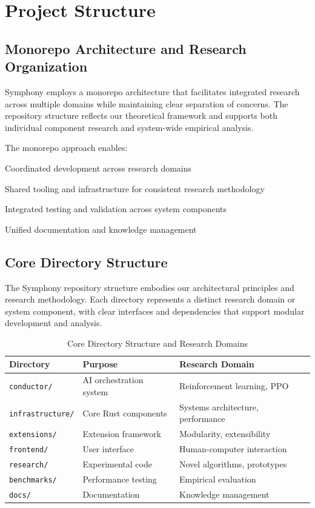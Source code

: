 \section*{Project Structure}

\subsection*{Monorepo Architecture and Research Organization}

Symphony employs a monorepo architecture that facilitates integrated research across multiple domains while maintaining clear separation of concerns. The repository structure reflects our theoretical framework and supports both individual component research and system-wide empirical analysis.

The monorepo approach enables:
\begin{compactlist}
    \item Coordinated development across research domains
    \item Shared tooling and infrastructure for consistent research methodology
    \item Integrated testing and validation across system components
    \item Unified documentation and knowledge management
\end{compactlist}

\subsection*{Core Directory Structure}

The Symphony repository structure embodies our architectural principles and research methodology. Each directory represents a distinct research domain or system component, with clear interfaces and dependencies that support modular development and analysis.

\begin{table}[ht]
\centering
\begin{tabular}{@{}lll@{}}
\toprule
\textbf{Directory} & \textbf{Purpose} & \textbf{Research Domain} \\
\midrule
\texttt{conductor/} & AI orchestration system & Reinforcement learning, PPO \\
\texttt{infrastructure/} & Core Rust components & Systems architecture, performance \\
\texttt{extensions/} & Extension framework & Modularity, extensibility \\
\texttt{frontend/} & User interface & Human-computer interaction \\
\texttt{research/} & Experimental code & Novel algorithms, prototypes \\
\texttt{benchmarks/} & Performance testing & Empirical evaluation \\
\texttt{docs/} & Documentation & Knowledge management \\
\bottomrule
\end{tabular}
\caption{Core Directory Structure and Research Domains}
\end{table}

